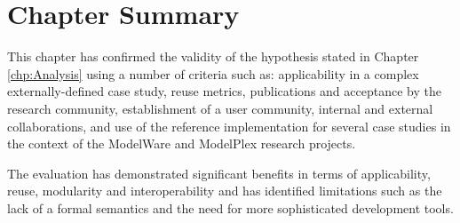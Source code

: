 \section{Chapter Summary}

This chapter has confirmed the validity of the hypothesis stated in Chapter \ref{chp:Analysis} using a number of criteria such as: applicability in a complex externally-defined case study, reuse metrics, publications and acceptance by the research community, establishment of a user community, internal and external collaborations, and use of the reference implementation for several case studies in the context of the ModelWare and ModelPlex research projects.

The evaluation has demonstrated significant benefits in terms of applicability, reuse, modularity and interoperability and has identified limitations such as the lack of a formal semantics and the need for more sophisticated development tools.